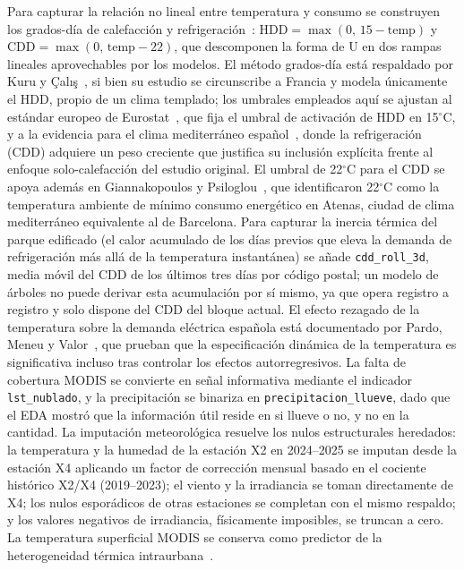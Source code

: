 \documentclass[12pt, a4paper]{article}
\begin{document}
Para capturar la relación no lineal entre temperatura y consumo se construyen los grados-día de calefacción y refrigeración~\cite{kuru2019}: $\text{HDD}=\max(0,\,15-\text{temp})$ y $\text{CDD}=\max(0,\,\text{temp}-22)$, que descomponen la forma de U en dos rampas lineales aprovechables por los modelos. El método grados-día está respaldado por Kuru y Çalış~\cite{kuru2019}, si bien su estudio se circunscribe a Francia y modela únicamente el HDD, propio de un clima templado; los umbrales empleados aquí se ajustan al estándar europeo de Eurostat~\cite{eurostat_chdd}, que fija el umbral de activación de HDD en 15$^\circ$C, y a la evidencia para el clima mediterráneo español~\cite{cienciastecnologia2012}, donde la refrigeración (CDD) adquiere un peso creciente que justifica su inclusión explícita frente al enfoque solo-calefacción del estudio original. El umbral de 22$^\circ$C para el CDD se apoya además en Giannakopoulos y Psiloglou~\cite{giannakopoulos2006}, que identificaron 22$^\circ$C como la temperatura ambiente de mínimo consumo energético en Atenas, ciudad de clima mediterráneo equivalente al de Barcelona. Para capturar la inercia térmica del parque edificado (el calor acumulado de los días previos que eleva la demanda de refrigeración más allá de la temperatura instantánea) se añade \texttt{cdd\_roll\_3d}, media móvil del CDD de los últimos tres días por código postal; un modelo de árboles no puede derivar esta acumulación por sí mismo, ya que opera registro a registro y solo dispone del CDD del bloque actual. El efecto rezagado de la temperatura sobre la demanda eléctrica española está documentado por Pardo, Meneu y Valor~\cite{pardo2002}, que prueban que la especificación dinámica de la temperatura es significativa incluso tras controlar los efectos autorregresivos. La falta de cobertura MODIS se convierte en señal informativa mediante el indicador \texttt{lst\_nublado}, y la precipitación se binariza en \texttt{precipitacion\_llueve}, dado que el EDA mostró que la información útil reside en si llueve o no, y no en la cantidad. La imputación meteorológica resuelve los nulos estructurales heredados: la temperatura y la humedad de la estación X2 en 2024--2025 se imputan desde la estación X4 aplicando un factor de corrección mensual basado en el cociente histórico X2/X4 (2019--2023); el viento y la irradiancia se toman directamente de X4; los nulos esporádicos de otras estaciones se completan con el mismo respaldo; y los valores negativos de irradiancia, físicamente imposibles, se truncan a cero. La temperatura superficial MODIS se conserva como predictor de la heterogeneidad térmica intraurbana~\cite{salvati2017}.
\end{document}
